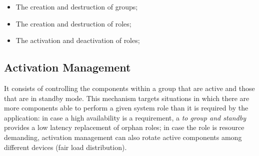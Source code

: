 \begin{itemize}
	\item The creation and destruction of groups;
	
	\item The creation and destruction of roles;
	
	\item The activation and deactivation of roles;
\end{itemize}





\subsection{Activation Management}

It consists of controlling the components within a group that are active and those that are in standby mode. This mechanism targets situations in which there are more components able to perform a given system role than it is required by the application: in case a high availability is a requirement, a \textit{to group and standby} provides a low latency replacement of orphan roles; in case the role is resource demanding, activation management can also rotate active components among different devices (fair load distribution). 



